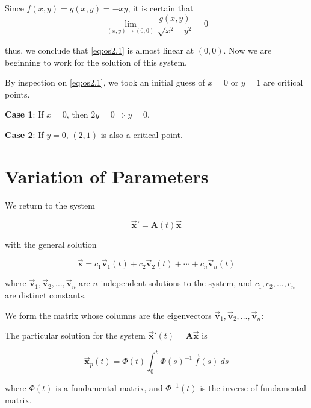 \begin{solution}
    Since $f(x,y) = g(x,y) = -xy$, it is certain that 
    \begin{equation*}
        \lim_{(x,y) \to (0, 0)} \frac{g(x,y)}{\sqrt{x^2 + y^2}} = 0
    \end{equation*}

    thus, we conclude that \eqref{eq:os2.1} is almost linear at $(0,0)$. Now we are beginning to work for the 
    solution of this system.

    By inspection on \eqref{eq:os2.1}, we took an initial guess of $x = 0$ or $y = 1$ are critical points.

    \textbf{Case 1}: If $x = 0$, then $2y = 0 \Rightarrow y =0$.

    \textbf{Case 2}: If $y = 0$, $(2, 1)$ is also a critical point.
\end{solution}

\section{Variation of Parameters}

We return to the system 

\begin{equation}
    \overrightarrow{\mathbf{x}}' = \mathbf{A}(t) \overrightarrow{\mathbf{x}}
\end{equation}

with the general solution 

\begin{equation}
    \overrightarrow{\mathbf{x}} = c_1 \overrightarrow{\mathbf{v}}_1(t) + c_2 \overrightarrow{\mathbf{v}}_2(t) 
    + \cdots + c_n \overrightarrow{\mathbf{v}}_n(t)
\end{equation}

where $\overrightarrow{\mathbf{v}}_1, \overrightarrow{\mathbf{v}}_2, \ldots, \overrightarrow{\mathbf{v}}_n$ are 
$n$ independent solutions to the system, and $c_1, c_2, \ldots, c_n$ are distinct constants.

We form the matrix whose columns are the eigenvectors $\overrightarrow{\mathbf{v}}_1, \overrightarrow{\mathbf{v}}_2, \ldots, \overrightarrow{\mathbf{v}}_n$:

\begin{theorem}
    The particular solution for the system $\overrightarrow{\mathbf{x}}'(t) = \mathbf{A} \overrightarrow{\mathbf{x}}$ is 

    \begin{equation}
        \overrightarrow{\mathbf{x}}_p(t) = \Phi (t) \int^t_0 \Phi(s)^{-1}\, \overrightarrow{f}(s) \> ds
    \end{equation}

    where $\Phi(t)$ is a fundamental matrix, and $\Phi^{-1}(t)$ is the inverse of fundamental matrix.
\end{theorem}

